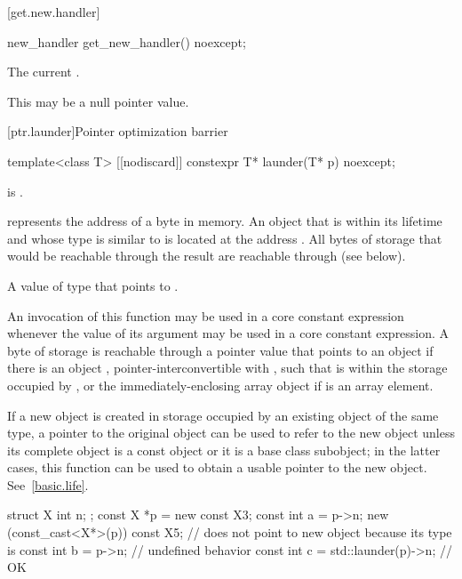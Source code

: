 [get.new.handler]{}

%
\begin{itemdecl}
new_handler get_new_handler() noexcept;
\end{itemdecl}

\begin{itemdescr}
\pnum
\returns
The current .
\begin{note}
This may be a null pointer value.
\end{note}
\end{itemdescr}

[ptr.launder]{Pointer optimization barrier}

%
\begin{itemdecl}
template<class T> [[nodiscard]] constexpr T* launder(T* p) noexcept;
\end{itemdecl}

\begin{itemdescr}
\pnum
\mandates
{} is .

\pnum
\expects
{} represents the address  of a byte in memory.
An object  that is within its lifetime
and whose type is similar to 
is located at the address .
All bytes of storage that would be reachable through the result
are reachable through  (see below).

\pnum
\returns
A value of type  that points to .

\pnum
\remarks
An invocation of this function
may be used in a core constant expression
whenever the value of its argument
may be used in a core constant expression.
A byte of storage  is
reachable through a pointer value
that points to an object 
if there is an object ,
pointer-interconvertible with ,
such that  is within the storage occupied by
, or
the immediately-enclosing array object if  is an array element.

\pnum
\begin{note}
If a new object is created
in storage occupied by an existing object of the same type,
a pointer to the original object
can be used to refer to the new object
unless its complete object is a const object or it is a base class subobject;
in the latter cases,
this function can be used to obtain a usable pointer to the new object.
See~\ref{basic.life}.
\end{note}

\pnum
\begin{example}
\begin{codeblock}
struct X { int n; };
const X *p = new const X{3};
const int a = p->n;
new (const_cast<X*>(p)) const X{5}; //  does not point to new object because its type is 
const int b = p->n;                 // undefined behavior
const int c = std::launder(p)->n;   // OK
\end{codeblock}
\end{example}
\end{itemdescr}

